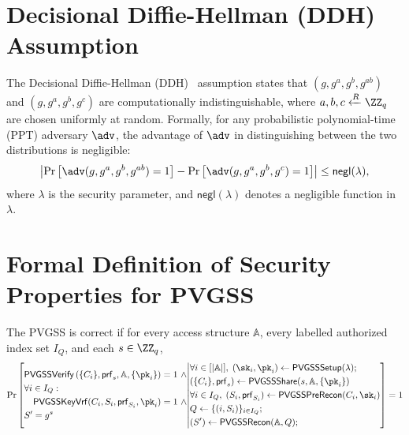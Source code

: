\documentclass[runningheads]{llncs}
\newcommand{\pvgssSetup}{\mathsf{PVGSSSetup}}
\newcommand{\pvgssShare}{\mathsf{PVGSSShare}}
\newcommand{\pvgssVerify}{\mathsf{PVGSSVerify}}
\newcommand{\pvgssPreRecon}{\mathsf{PVGSSPreRecon}}
\newcommand{\pvgssKeyVrf}{\mathsf{PVGSSKeyVrf}}
\newcommand{\pvgssRecon}{\mathsf{PVGSSRecon}}
\newcommand{\proofs}{\mathsf{prf}}
\begin{document}
\section{Decisional Diffie-Hellman (DDH) Assumption}
The Decisional Diffie-Hellman (DDH)~\cite{Cascudo2017PVSS} assumption states that $(g, g^a, g^b, g^{ab})$ and $(g, g^a, g^b, g^c)$ are computationally indistinguishable, where $a, b, c \xleftarrow{R} \ZZ_q$ are chosen uniformly at random.
Formally, for any probabilistic polynomial-time (PPT) adversary $\adv$, the advantage of $\adv$ in distinguishing between the two distributions is negligible:
\[
\left| \Pr\left[\adv(g, g^a, g^b, g^{ab}) = 1\right] - \Pr\left[\adv(g, g^a, g^b, g^c) = 1\right] \right| \leq \mathsf{negl}(\lambda),
\]
where $\lambda$ is the security parameter, and $\mathsf{negl}(\lambda)$ denotes a negligible function in $\lambda$.



\section{Formal Definition of Security Properties for PVGSS}
\label{sec:pvgss_properties}
\begin{definition}[Correctness]\label{def:Correctness}
    The PVGSS is correct if for every access structure $\mathbb{A}$, every labelled authorized index set $I_Q$, and each $s\in\ZZ_q$,
    {\small \[
    \Pr\left[
    \begin{aligned}
        &\pvgssVerify\left( \{C_i\}, \proofs_s, \mathbb{A},\{\pk_i\} \right) = 1 \ \land \\
        &\forall i \in I_{Q}:\\
        &\quad \pvgssKeyVrf(C_i, S_i, \proofs_{S_i}, \pk_i) = 1\ \land \\
        & S' = g^s
    \end{aligned}
        \middle|
    \begin{aligned}
        &\forall i\in[|\mathbb{A}|],\;(\sk_i,\pk_i)\gets \pvgssSetup(\lambda); \\
        &(\{C_i\}, \proofs_s)\gets \pvgssShare(s,\mathbb{A}, \{\pk_i\}) \\
        &\forall i \in I_{Q},\;(S_i, \proofs_{S_i}) \gets \pvgssPreRecon(C_i, \sk_i) \\
        &Q\gets\{(i,S_i)\}_{i\in I_Q};\\
        &(S') \gets \pvgssRecon(\mathbb{A},Q);
    \end{aligned}
    \right]
    =1\]}
\end{definition}
\end{document}
